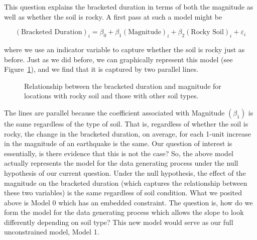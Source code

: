 \documentclass[
  letterpaper,
  DIV=11,
  numbers=noendperiod]{scrreprt}
\theoremstyle{definition}
\theoremstyle{definition}
\theoremstyle{plain}
\theoremstyle{remark}
\begin{document}
This question explains the bracketed duration in terms of both the
magnitude as well as whether the soil is rocky. A first pass at such a
model might be

\[
(\text{Bracketed Duration})_i = \beta_0 + \beta_1(\text{Magnitude})_i + \beta_2(\text{Rocky Soil})_i + \varepsilon_i
\]

where we use an indicator variable to capture whether the soil is rocky
just as before. Just as we did before, we can graphically represent this
model (see Figure~\ref{fig-regextensions-ind-plot2}), and we find that
it is captured by two parallel lines.

\begin{figure}


\caption{\label{fig-regextensions-ind-plot2}Relationship between the
bracketed duration and magnitude for locations with rocky soil and those
with other soil types.}

\end{figure}%

The lines are parallel because the coefficient associated with Magnitude
\(\left(\beta_1\right)\) is the same regardless of the type of soil.
That is, regardless of whether the soil is rocky, the change in the
bracketed duration, on average, for each 1-unit increase in the
magnitude of an earthquake is the same. Our question of interest is
essentially, is there evidence that this is not the case? So, the above
model actually represents the model for the data generating process
under the null hypothesis of our current question. Under the null
hypothesis, the effect of the magnitude on the bracketed duration (which
captures the relationship between these two variables) is the same
regardless of soil condition. What we posited above is Model 0 which has
an embedded constraint. The question is, how do we form the model for
the data generating process which allows the slope to look differently
depending on soil type? This new model would serve as our full
unconstrained model, Model 1.
\end{document}
